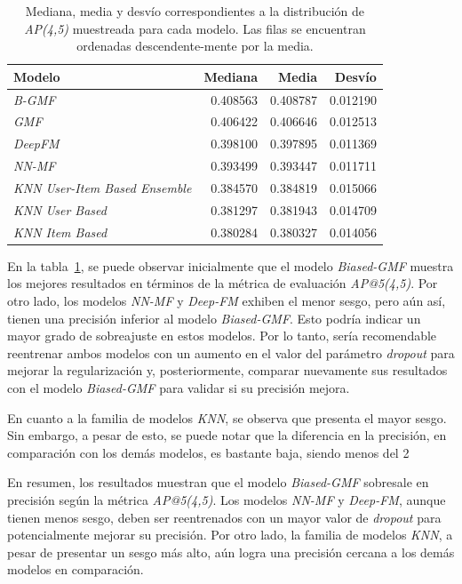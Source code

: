\documentclass[11pt,a4paper,twoside]{thesis}
\begin{document}
\begin{table}[!htb]
	\centering
	\footnotesize
	\begin{tabular}{lrrr}
		\hline
		Modelo                                & Mediana  & Media    & Desvío   \\
		\hline
		\textit{B-GMF}                        & 0.408563 & 0.408787 & 0.012190 \\
		\textit{GMF}                          & 0.406422 & 0.406646 & 0.012513 \\
		\textit{DeepFM}                       & 0.398100 & 0.397895 & 0.011369 \\
		\textit{NN-MF}                        & 0.393499 & 0.393447 & 0.011711 \\
		\textit{KNN User-Item Based Ensemble} & 0.384570 & 0.384819 & 0.015066 \\
		\textit{KNN User Based}               & 0.381297 & 0.381943 & 0.014709 \\
		\textit{KNN Item Based}               & 0.380284 & 0.380327 & 0.014056 \\
		\hline
	\end{tabular}
	\caption{
		Mediana, media y desvío correspondientes a la distribución de
		\textit{AP(4,5)} muestreada para cada modelo.
		Las filas se encuentran ordenadas descendente-mente por la media.}
	\label{table:ap_at_k}
\end{table}

En la tabla~\ref{table:ap_at_k}, se puede observar inicialmente que el modelo
\textit{Biased-GMF} muestra los mejores resultados en términos de la métrica de
evaluación \textit{AP@5(4,5)}. Por otro lado, los modelos \textit{NN-MF} y
\textit{Deep-FM} exhiben el menor sesgo, pero aún así, tienen una precisión
inferior al modelo \textit{Biased-GMF}. Esto podría indicar un mayor grado de
sobreajuste en estos modelos. Por lo tanto, sería recomendable reentrenar ambos
modelos con un aumento en el valor del parámetro \textit{dropout} para mejorar
la regularización y, posteriormente, comparar nuevamente sus resultados con el
modelo \textit{Biased-GMF} para validar si su precisión mejora.

En cuanto a la familia de modelos \textit{KNN}, se observa que presenta el
mayor sesgo. Sin embargo, a pesar de esto, se puede notar que la diferencia en
la precisión, en comparación con los demás modelos, es bastante baja, siendo
menos del 2%

En resumen, los resultados muestran que el modelo \textit{Biased-GMF} sobresale
en precisión según la métrica \textit{AP@5(4,5)}. Los modelos \textit{NN-MF} y
\textit{Deep-FM}, aunque tienen menos sesgo, deben ser reentrenados con un
mayor valor de \textit{dropout} para potencialmente mejorar su precisión. Por
otro lado, la familia de modelos \textit{KNN}, a pesar de presentar un sesgo
más alto, aún logra una precisión cercana a los demás modelos en comparación.
\clearpage
\end{document}
